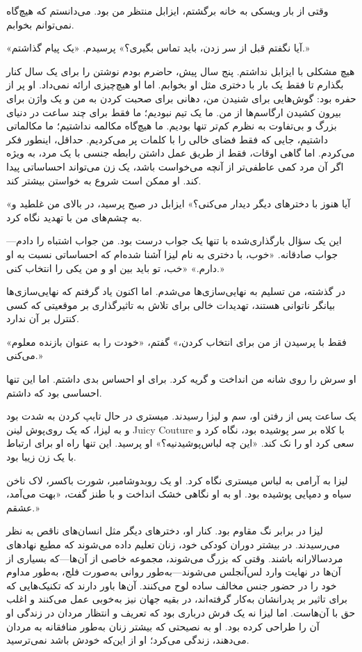 
وقتی از بار ویسکی به خانه برگشتم، ایزابل منتظر من بود. می‌دانستم که هیچ‌گاه نمی‌توانم بخوابم.  

«آیا نگفتم قبل از سر زدن، باید تماس بگیری؟» پرسیدم.  
«یک پیام گذاشتم.»  

هیچ مشکلی با ایزابل نداشتم. پنج سال پیش، حاضرم بودم نوشتن را برای یک سال کنار بگذارم تا فقط یک بار با دختری مثل او بخوابم. اما او هیچ‌چیزی ارائه نمی‌داد. او پر از حفره بود: گوش‌هایی برای شنیدن من، دهانی برای صحبت کردن به من و یک واژن برای بیرون کشیدن ارگاسم‌ها از من. ما یک تیم نبودیم؛ ما فقط برای چند ساعت در دنیای بزرگ و بی‌تفاوت به نظرم کم‌تر تنها بودیم. ما هیچ‌گاه مکالمه نداشتیم؛ ما مکالماتی داشتیم، جایی که فقط فضای خالی را با کلمات پر می‌کردیم. حداقل، اینطور فکر می‌کردم. اما گاهی اوقات، فقط از طریق عمل داشتن رابطه جنسی با یک مرد، به ویژه اگر آن مرد کمی عاطفی‌تر از آنچه می‌خواست باشد، یک زن می‌تواند احساساتی پیدا کند. او ممکن است شروع به خواستن بیشتر کند.  

«آیا هنوز با دخترهای دیگر دیدار می‌کنی؟» ایزابل در صبح پرسید، در بالای من غلطید و به چشم‌های من با تهدید نگاه کرد.  

این یک سؤال بارگذاری‌شده با تنها یک جواب درست بود. من جواب اشتباه را دادم—جواب صادقانه. «خوب، با دختری به نام لیزا آشنا شده‌ام که احساساتی نسبت به او دارم.»  
«خب، تو باید بین او و من یکی را انتخاب کنی.»  

در گذشته، من تسلیم به نهایی‌سازی‌ها می‌شدم. اما اکنون یاد گرفتم که نهایی‌سازی‌ها بیانگر ناتوانی هستند، تهدیدات خالی برای تلاش به تاثیرگذاری بر موقعیتی که کسی کنترل بر آن ندارد.  

«فقط با پرسیدن از من برای انتخاب کردن،» گفتم، «خودت را به عنوان بازنده معلوم می‌کنی.»  

او سرش را روی شانه من انداخت و گریه کرد. برای او احساس بدی داشتم. اما این تنها احساسی بود که داشتم.  

یک ساعت پس از رفتن او، سم و لیزا رسیدند. میستری در حال تایپ کردن به شدت بود و به لیزا، که یک روی‌پوش لینن Juicy Couture با کلاه بر سر پوشیده بود، نگاه کرد و سعی کرد او را نک کند. «این چه لباس‌پوشیدنیه؟» او پرسید. این تنها راه او برای ارتباط با یک زن زیبا بود.  

لیزا به آرامی به لباس میستری نگاه کرد. او یک روبدو‌شامبر، شورت باکسر، لاک ناخن سیاه و دمپایی پوشیده بود. او به او نگاهی خشک انداخت و با طنز گفت، «بهت می‌آمد، عشقم.»  

لیزا در برابر نگ مقاوم بود. کنار او، دخترهای دیگر مثل انسان‌های ناقص به نظر می‌رسیدند. در بیشتر دوران کودکی خود، زنان تعلیم داده می‌شوند که مطیع نهادهای مردسالارانه باشند. وقتی که بزرگ می‌شوند، مجموعه خاصی از آن‌ها—که بسیاری از آن‌ها در نهایت وارد لس‌آنجلس می‌شوند—به‌طور روانی به‌صورت فلج، به‌طور مداوم خود را در حضور جنس مخالف ساده لوح می‌کنند. آن‌ها باور دارند که تکنیک‌هایی که برای تاثیر بر پدرانشان به‌کار گرفته‌اند، در بقیه جهان نیز به‌خوبی عمل می‌کنند و اغلب حق با آن‌هاست. اما لیزا نه یک فرش درباری بود که تعریف و انتظار مردان در زندگی او آن را طراحی کرده بود. او به نصیحتی که بیشتر زنان به‌طور منافقانه به مردان می‌دهند، زندگی می‌کرد؛ او از این‌که خودش باشد نمی‌ترسید.  

